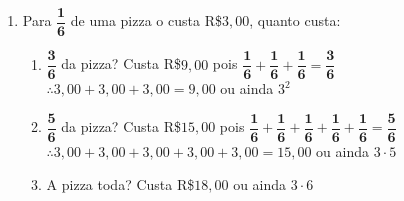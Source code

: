 \begin{enumerate}
\begin{enumerate}[label=\alph*)]
	 	\item \begin{tabular}{|c|c|c|}
	 		\hline
	 		\cellcolor{gray} & \cellcolor{gray} & \cellcolor{gray} \\
	 		\hline
	 		& \cellcolor{gray} & \cellcolor{gray} \\
	 		\hline
	 	\end{tabular}
	 	representa $\space \dfrac{\textbf{1}}{\textbf{6}}$ e a parte pintada $\space$ representa $\space \dfrac{\textbf{5}}{\textbf{6}}$
		
	\item \begin{tabular}{|c|c|}
		\hline
		\cellcolor{green} & \cellcolor{green} \\
		\hline
		\cellcolor{green} & \cellcolor{green} \\
		\hline
	\end{tabular}
representa $\space \dfrac{\textbf{1}}{\textbf{4}}$ e a parte pintada $\space$ representa $\space \dfrac{\textbf{4}}{\textbf{4}}$
	\end{enumerate}
	
	\item Para $\dfrac{\textbf{1}}{\textbf{6}}$ de uma pizza o custa R\$$3,00$, quanto custa: \\
	
		\begin{enumerate}[label=\alph*)]
			\item $\dfrac{\textbf{3}}{\textbf{6}}$ da pizza? Custa R\$$9,00$ pois $\dfrac{\textbf{1}}{\textbf{6}} + \dfrac{\textbf{1}}{\textbf{6}} + \dfrac{\textbf{1}}{\textbf{6}} = \dfrac{\textbf{3}}{\textbf{6}}$ \\ \newline $\therefore 3,00 + 3,00 + 3,00 = 9,00$ ou ainda $3^{2}$ \\
			
			\item $\dfrac{\textbf{5}}{\textbf{6}}$ da pizza? Custa R\$$15,00$ pois $\dfrac{\textbf{1}}{\textbf{6}} + \dfrac{\textbf{1}}{\textbf{6}} + \dfrac{\textbf{1}}{\textbf{6}} + \dfrac{\textbf{1}}{\textbf{6}} + \dfrac{\textbf{1}}{\textbf{6}} = \dfrac{\textbf{5}}{\textbf{6}}$ \\ \newline $\therefore 3,00 + 3,00 + 3,00 + 3,00 + 3,00 = 15,00$ ou ainda $3\cdot5$ \\
			
			\item A pizza toda? Custa R\$$18,00$ ou ainda $3 \cdot 6$
		\end{enumerate}
	

\end{enumerate}

